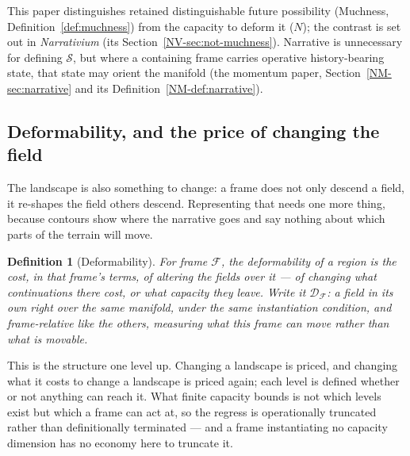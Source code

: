 \documentclass[11pt,a4paper]{article}
\newtheorem{definition}{Definition}[section]
\theoremstyle{remark}
\newcommand{\Frame}{\mathcal F}
\newcommand{\Seldon}{\mathcal S}
\begin{document}
This paper distinguishes retained distinguishable future possibility (Muchness,
Definition~\ref{def:muchness}) from the capacity to deform it ($N$); the contrast is set out in
\emph{Narrativium} (its Section~\ref{NV-sec:not-muchness}). Narrative is unnecessary for defining
$\Seldon$, but where a containing frame carries operative history-bearing state, that state may
orient the manifold (the momentum paper, Section~\ref{NM-sec:narrative} and its
Definition~\ref{NM-def:narrative}).

\subsection*{Deformability, and the price of changing the field}

The landscape is also something to change: a frame does not only descend a field, it re-shapes the
field others descend. Representing that needs one more thing, because contours show where the
narrative goes and say nothing about which parts of the terrain will move.

\begin{definition}[Deformability]\label{def:deformability}
For frame $\Frame$, the \emph{deformability} of a region is the cost, in that frame's terms, of
altering the fields over it --- of changing what continuations there cost, or what capacity they
leave. Write it $\mathcal{D}_{\Frame}$: a field in its own right over the same manifold, under the same
instantiation condition, and frame-relative like the others, measuring what this frame can move
rather than what is movable.
\end{definition}

This is the structure one level up. Changing a landscape is priced, and changing what it costs to
change a landscape is priced again; each level is defined whether or not anything can reach it. What
finite capacity bounds is not which levels exist but which a frame can act at, so the regress is
operationally truncated rather than definitionally terminated --- and a frame instantiating no
capacity dimension has no economy here to truncate it.
\end{document}
